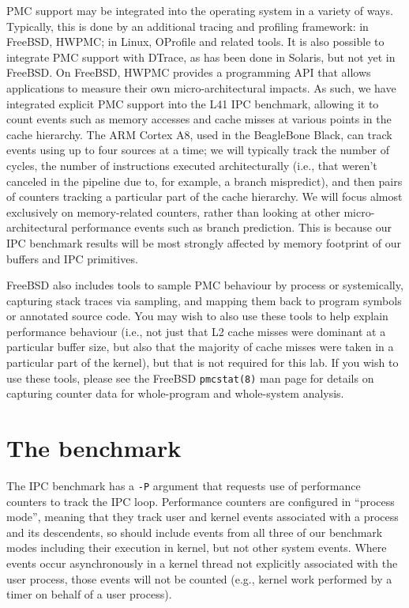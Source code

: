 \documentclass[a4paper,10pt]{article}
\begin{document}
PMC support may be integrated into the operating system in a variety of ways.
Typically, this is done by an additional tracing and profiling framework: in
FreeBSD, HWPMC; in Linux, OProfile and related tools.
It is also possible to integrate PMC support with DTrace, as has been done in
Solaris, but not yet in FreeBSD.
On FreeBSD, HWPMC provides a programming API that allows applications to
measure their own micro-architectural impacts.
As such, we have integrated explicit PMC support into the L41 IPC benchmark,
allowing it to count events such as memory accesses and cache misses at
various points in the cache hierarchy.
The ARM Cortex A8, used in the BeagleBone Black, can track events using up to
four sources at a time; we will typically track the number of cycles, the
number of instructions executed architecturally (i.e., that weren't canceled
in the pipeline due to, for example, a branch mispredict), and then pairs of
counters tracking a particular part of the cache hierarchy.
We will focus almost exclusively on memory-related counters, rather than
looking at other micro-architectural performance events such as branch
prediction.
This is because our IPC benchmark results will be most strongly affected by
memory footprint of our buffers and IPC primitives.

FreeBSD also includes tools to sample PMC behaviour by process or
systemically, capturing stack traces via sampling, and mapping them back to
program symbols or annotated source code.
You may wish to also use these tools to help explain performance behaviour
(i.e., not just that L2 cache misses were dominant at a particular buffer
size, but also that the majority of cache misses were taken in a particular
part of the kernel), but that is not required for this lab.
If you wish to use these tools, please see the FreeBSD \texttt{pmcstat(8)}
man page for details on capturing counter data for whole-program and
whole-system analysis.

\section*{The benchmark}

The IPC benchmark has a \texttt{-P} argument that requests use of performance
counters to track the IPC loop.
Performance counters are configured in ``process mode'', meaning that they
track user and kernel events associated with a process and its descendents, so
should include events from all three of our benchmark modes including their
execution in kernel, but not other system events.
Where events occur asynchronously in a kernel thread not explicitly associated
with the user process, those events will not be counted (e.g., kernel work
performed by a timer on behalf of a user process).
\end{document}
